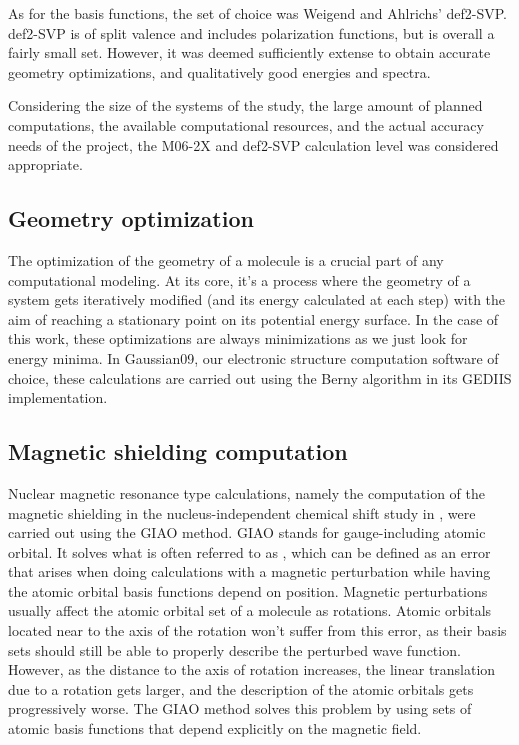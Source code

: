 As for the basis functions, the set of choice was Weigend and Ahlrichs' def2-SVP.
def2-SVP is of split valence and includes polarization functions, but is overall a fairly small set.
However, it was deemed sufficiently extense to obtain accurate geometry optimizations, and qualitatively good energies and spectra.

Considering the size of the systems of the study, the large amount of planned computations, the available computational resources, and the actual accuracy needs of the project, the M06-2X and def2-SVP calculation level was considered appropriate.

\subsection{Geometry optimization}
The optimization of the geometry of a molecule is a crucial part of any computational modeling.
At its core, it's a process where the geometry of a system gets iteratively modified (and its energy calculated at each step) with the aim of reaching a stationary point on its potential energy surface.
In the case of this work, these optimizations are always minimizations as we just look for energy minima.
In Gaussian09,\cite{gaussian09} our electronic structure computation software of choice, these calculations are carried out using the Berny algorithm in its GEDIIS implementation.

\subsection{Magnetic shielding computation}
Nuclear magnetic resonance type calculations, namely the computation of the magnetic shielding in the nucleus-independent chemical shift study in , were carried out using the GIAO method.
GIAO stands for gauge-including atomic orbital.
It solves what is often referred to as , which can be defined as an error that arises when doing calculations with a magnetic perturbation while having the atomic orbital basis functions depend on position.
Magnetic perturbations usually affect the atomic orbital set of a molecule as rotations.
Atomic orbitals located near to the axis of the rotation won't suffer from this error, as their basis sets should still be able to properly describe the perturbed wave function.
However, as the distance to the axis of rotation increases, the linear translation due to a rotation gets larger, and the description of the atomic orbitals gets progressively worse.
The GIAO method solves this problem by using sets of atomic basis functions that depend explicitly on the magnetic field.

